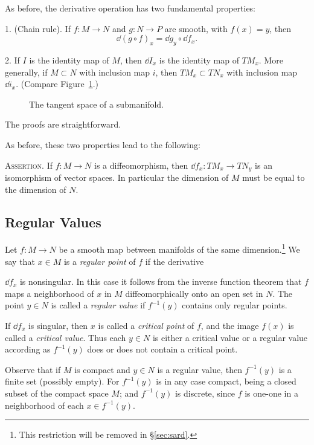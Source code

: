 
As before, the derivative operation has two fundamental properties:

1. (Chain rule). If $f : M \to N$ and $g : N \to P$ are smooth, with $f(x) = y$, then
\[
\dd(g \circ f)_x = \dd g_y \circ \dd f_x.
\]

2. If $I$ is the identity map of $M$, then $\dd I_x$ is the identity map of $TM_x$. More generally, if $M \subset N$ with inclusion map $i$, then $TM_x \subset TN_x$ with inclusion map $\dd i_x$. (Compare Figure~\ref{fig:milnor-02}.)

\begin{figure}[htbp]
\centering
\setcounter{figure}{1}%
\caption{The tangent space of a submanifold.}\label{fig:milnor-02}
\end{figure}

The proofs are straightforward.

As before, these two properties lead to the following:

\textsc{Assertion.} If $f : M \to N$ is a diffeomorphism, then $\dd f_x : TM_x \to TN_y$ is an isomorphism of vector spaces. In particular the dimension of $M$ must be equal to the dimension of $N$.

\subsection{Regular Values}

Let $f : M \to N$ be a smooth map between manifolds of the same dimension.\footnote{This restriction will be removed in \S\ref{sec:sard}.} We say that $x \in M$ is a \textit{regular point} of $f$ if the derivative



$\dd f_x$ is nonsingular. In this case it follows from the inverse function theorem that $f$ maps a neighborhood of $x$ in $M$ diffeomorphically onto an open set in $N$. The point $y \in N$ is called a \textit{regular value} if $f^{-1}(y)$ contains only regular points.

If $\dd f_x$ is singular, then $x$ is called a \textit{critical point} of $f$, and the image $f(x)$ is called a \textit{critical value}. Thus each $y \in N$ is either a critical value or a regular value according as $f^{-1}(y)$ does or does not contain a critical point.

Observe that if $M$ is compact and $y \in N$ is a regular value, then $f^{-1}(y)$ is a finite set (possibly empty). For $f^{-1}(y)$ is in any case compact, being a closed subset of the compact space $M$; and $f^{-1}(y)$ is discrete, since $f$ is one-one in a neighborhood of each $x \in f^{-1}(y)$.

